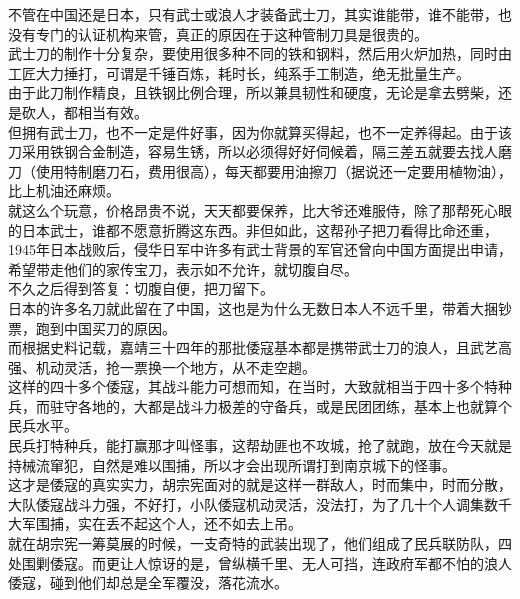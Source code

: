\begin{multicols}{\theparacolNo}
不管在中国还是日本，只有武士或浪人才装备武士刀，其实谁能带，谁不能带，也没有专门的认证机构来管，真正的原因在于这种管制刀具是很贵的。\\

武士刀的制作十分复杂，要使用很多种不同的铁和钢料，然后用火炉加热，同时由工匠大力捶打，可谓是千锤百炼，耗时长，纯系手工制造，绝无批量生产。\\

由于此刀制作精良，且铁钢比例合理，所以兼具韧性和硬度，无论是拿去劈柴，还是砍人，都相当有效。\\

但拥有武士刀，也不一定是件好事，因为你就算买得起，也不一定养得起。由于该刀采用铁钢合金制造，容易生锈，所以必须得好好伺候着，隔三差五就要去找人磨刀（使用特制磨刀石，费用很高），每天都要用油擦刀（据说还一定要用植物油），比上机油还麻烦。\\

就这么个玩意，价格昂贵不说，天天都要保养，比大爷还难服侍，除了那帮死心眼的日本武士，谁都不愿意折腾这东西。非但如此，这帮孙子把刀看得比命还重，1945年日本战败后，侵华日军中许多有武士背景的军官还曾向中国方面提出申请，希望带走他们的家传宝刀，表示如不允许，就切腹自尽。\\

不久之后得到答复：切腹自便，把刀留下。\\

日本的许多名刀就此留在了中国，这也是为什么无数日本人不远千里，带着大捆钞票，跑到中国买刀的原因。\\

而根据史料记载，嘉靖三十四年的那批倭寇基本都是携带武士刀的浪人，且武艺高强、机动灵活，抢一票换一个地方，从不走空趟。\\

这样的四十多个倭寇，其战斗能力可想而知，在当时，大致就相当于四十多个特种兵，而驻守各地的，大都是战斗力极差的守备兵，或是民团团练，基本上也就算个民兵水平。\\

民兵打特种兵，能打赢那才叫怪事，这帮劫匪也不攻城，抢了就跑，放在今天就是持械流窜犯，自然是难以围捕，所以才会出现所谓打到南京城下的怪事。\\

这才是倭寇的真实实力，胡宗宪面对的就是这样一群敌人，时而集中，时而分散，大队倭寇战斗力强，不好打，小队倭寇机动灵活，没法打，为了几十个人调集数千大军围捕，实在丢不起这个人，还不如去上吊。\\

就在胡宗宪一筹莫展的时候，一支奇特的武装出现了，他们组成了民兵联防队，四处围剿倭寇。而更让人惊讶的是，曾纵横千里、无人可挡，连政府军都不怕的浪人倭寇，碰到他们却总是全军覆没，落花流水。\\


\end{multicols}
